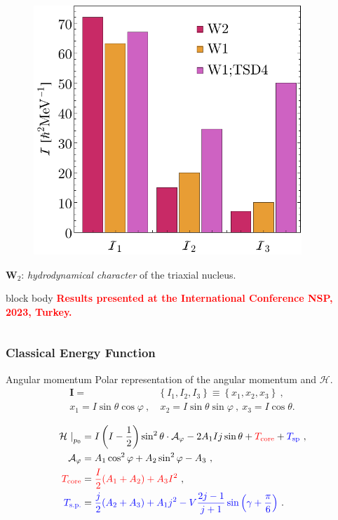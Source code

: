 \documentclass{beamer}
\begin{document}
\begin{frame}
\begin{columns}
\begin{column}{0.5\textwidth}
\begin{figure}
				\includegraphics[width=0.9\textwidth]{figures/parity-partners-plots/W1-W2-Mois.pdf}
			\end{figure}
			\vspace{-0.5cm}
			$\mathbf{W}_2$: \emph{hydrodynamical character} of the triaxial nucleus.
			\begin{beamercolorbox}[rounded=true,shadow=false, wd=\linewidth,]{block body}
				\centering
				\textcolor{red}{\footnotesize{\textbf{Results presented at the International Conference NSP, 2023, Turkey.}}}
			\end{beamercolorbox}
		\end{column}
	\end{columns}
\end{frame}

\begin{frame}
	\frametitle{Classical Energy Function}
	\begin{block}{Angular momentum}
		Polar representation of the angular momentum and $\mathcal{H}$.
		\begin{align}
			\mathbf{I}=&\left\{I_1,I_2,I_3\right\}\equiv\left\{x_1,x_2,x_3\right\}\ ,\nonumber\\
			x_1=I\sin\theta\cos\varphi\ ,&\ x_2=I\sin\theta\sin\varphi\ ,\ x_3=I\cos\theta.\nonumber
		\end{align}
	\end{block}
	\vspace{-0.5cm}
	\begin{align}
		\left. \mathcal{H}\ \right\vert_{p_0}&=I\left(I-\frac{1}{2}\right)\sin^2\theta\cdot \mathcal{A}_\varphi-2A_1Ij\sin\theta+{\color{red}T_\text{core}}+{\color{blue}T_\text{sp}}\ ,\nonumber\\
		\mathcal{A}_\varphi&=A_1\cos^2\varphi+A_2\sin^2\varphi-A_3\ ,\nonumber\\
		{\color{red}T_\text{core}}&={\color{red}\frac{I}{2}(A_1+A_2)+A_3I^2}\ ,\nonumber\\
		{\color{blue}T_\text{s.p.}}&={\color{blue}\frac{j}{2}(A_2+A_3)+A_1j^2-V\frac{2j-1}{j+1}\sin\left(\gamma+\frac{\pi}{6}\right)}\ .\nonumber
	\end{align}
\end{frame}
\end{document}
